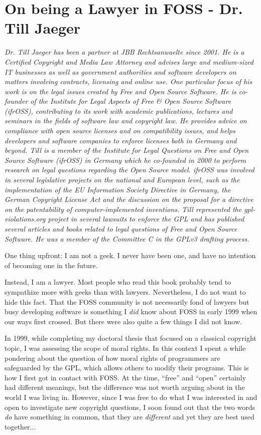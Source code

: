 \chapter{On being a Lawyer in FOSS - Dr. Till Jaeger} 

\textit{Dr. Till Jaeger has been a partner at JBB Rechtsanwaelte since 2001. He
is a Certified Copyright and Media Law Attorney and advises large and
medium-sized IT businesses as well as government authorities and software
developers on matters involving contracts, licensing and online use. One
particular focus of his work is on the legal issues created by Free and Open
Source Software. He is co-founder of the Institute for Legal Aspects of Free \&
Open Source Software (ifrOSS), contributing to its work with academic
publications, lectures and seminars in the fields of software law and copyright
law. He provides advice on compliance with open source licenses and on
compatibility issues, and helps developers and software companies to enforce
licenses both in Germany and beyond.
\newline
Till is a member of the Institute for Legal Questions on Free and Open Source
Software (ifrOSS) in Germany which he co-founded in 2000 to perform research on
legal questions regarding the Open Source model. ifrOSS was involved in several
legislative projects on the national and European level, such as the
implementation of the EU Information Society Directive in Germany, the German
Copyright License Act and the discussion on the proposal for a directive on the
patentability of computer-implemented inventions.
\newline
Till represented the gpl-violations.org project in several lawsuits to enforce
the GPL and has published several articles and books related to legal questions
of Free and Open Source Software. He was a member of the Committee C in the
GPLv3 drafting process.}

One thing upfront: I am not a geek. I never have been one, and have no intention
of becoming one in the future. 

Instead, I am a lawyer. Most people who read this book probably tend to
sympathize more with geeks than with lawyers. Nevertheless, I do not want to
hide this fact. That the FOSS community is not necessarily fond of lawyers but
busy developing software is something I \textit{did} know about FOSS in early
1999 when our ways first crossed. But there were also quite a few things I did
not know.

In 1999, while completing my doctoral thesis that focused on a classical
copyright topic, I was assessing the scope of moral rights. In this context I
spent a while pondering about the question of how moral rights of programmers
are safeguarded by the GPL, which allows others to modify their programs. This
is how I first got in contact with FOSS. At the time, ``free'' and ``open''
certainly had different meanings, but the difference was not worth arguing
about in the world I was living in. However, since I was free to do what I was
interested in and open to investigate new copyright questions, I soon found out
that the two words \textit{do} have something in common, that they are
\textit{different} and yet they are best used together...

